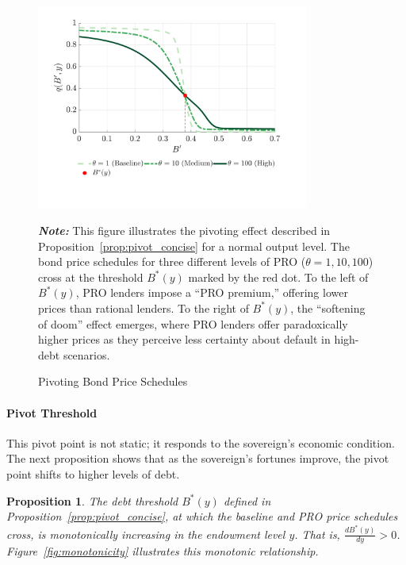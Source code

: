 \documentclass[12pt]{article}
\theoremstyle{plain}
\newtheorem{proposition}{Proposition}
\begin{document}
\begin{figure}[htb]
	\centering
	\includegraphics[width=0.8\textwidth]{../../pro-default-model/results/comparison_figure_5.pdf}
	\caption{Pivoting Bond Price Schedules}\label{fig:pivoting_proof}

	\parbox{\textwidth}{\small\textit{\textbf{Note:} }This figure illustrates the pivoting effect described in Proposition~\ref{prop:pivot_concise} for a normal output level. The bond price schedules for three different levels of PRO ($\theta = 1, 10, 100$) cross at the threshold $B^*(y)$ marked by the red dot. To the left of $B^*(y)$, PRO lenders impose a ``PRO premium,'' offering lower prices than rational lenders. To the right of $B^*(y)$, the ``softening of doom'' effect emerges, where PRO lenders offer paradoxically higher prices as they perceive less certainty about default in high-debt scenarios.}
\end{figure}

\paragraph{Pivot Threshold}This pivot point is not static; it responds to the sovereign's economic
condition. The next proposition shows that as the sovereign's fortunes improve,
the pivot point shifts to higher levels of debt.

\begin{proposition}
	\label{prop:monotonicity}
	The debt threshold $B^*(y)$ defined in Proposition~\ref{prop:pivot_concise}, at which the baseline and PRO price schedules cross, is monotonically increasing in the endowment level $y$. That is, $\frac{dB^*(y)}{dy} > 0$. Figure~\ref{fig:monotonicity} illustrates this monotonic relationship.
\end{proposition}
\end{document}
